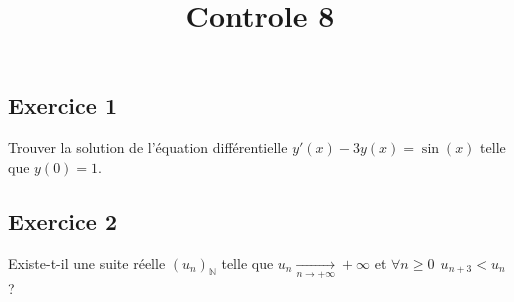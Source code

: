 \documentclass{article}
\begin{document}
\title{Controle 8}
\maketitle
\renewcommand{\labelitemi}{$\circ$}
\subsection*{Exercice 1}
Trouver la solution de l'{\'e}quation diff{\'e}rentielle $y'(x) -3y(x)=\sin(x)$
telle que $y(0)=1$.

\subsection*{Exercice 2}
Existe-t-il une suite r{\'e}elle $(u_n)_{\mathbb{N}}$ telle que $u_n
\xrightarrow[n \to +\infty]{} +\infty$ et $\forall n \geq 0 \ \
u_{n+3}<u_n$ ?








\end{document}
